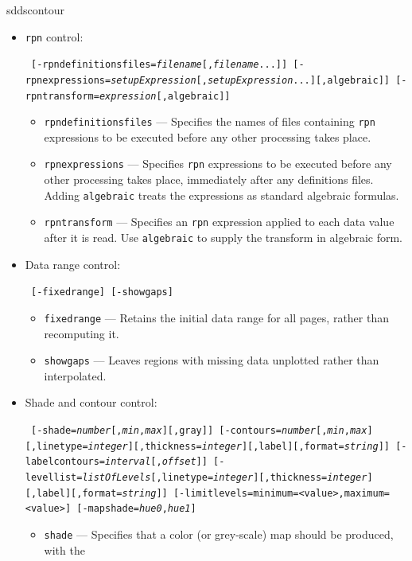 \begin{sddsprog}{sddscontour}
\begin{itemize}
    \item \verb|rpn| control:
\begin{flushleft}{\tt
[-rpndefinitionsfiles={\em filename}[,{\em filename}...]]
[-rpnexpressions={\em setupExpression}[,{\em setupExpression}...][,algebraic]]
[-rpntransform={\em expression}[,algebraic]]
}\end{flushleft}
        \begin{itemize}
        \item \verb|rpndefinitionsfiles| --- Specifies the names of files containing \verb|rpn| expressions
        to be executed before any other processing takes place.
        \item \verb|rpnexpressions| --- Specifies \verb|rpn| expressions to be executed before any other processing
         takes place, immediately after any definitions files.  Adding \verb|algebraic| treats the
         expressions as standard algebraic formulas.
        \item \verb|rpntransform| --- Specifies an \verb|rpn| expression applied to each data value after it is read.
         Use \verb|algebraic| to supply the transform in algebraic form.
        \end{itemize}
    \item Data range control:
\begin{flushleft}{\tt
[-fixedrange] [-showgaps]
}\end{flushleft}
        \begin{itemize}
        \item \verb|fixedrange| --- Retains the initial data range for all pages, rather than recomputing it.
        \item \verb|showgaps| --- Leaves regions with missing data unplotted rather than interpolated.
        \end{itemize}
    \item Shade and contour control:
\begin{flushleft}{\tt
[-shade={\em number}[,{\em min},{\em max}][,gray]]
[-contours={\em number}[,{\em min},{\em max}][,linetype={\em integer}][,thickness={\em integer}][,label][,format={\em string}]]
[-labelcontours={\em interval}[,{\em offset}]]
[-levellist={\em listOfLevels}[,linetype={\em integer}][,thickness={\em integer}][,label][,format={\em string}]]
[-limitlevels={minimum=<value>,}{maximum=<value>}]
[-mapshade={\em hue0},{\em hue1}]
}\end{flushleft}
        \begin{itemize}
        \item \verb|shade| --- Specifies that a color (or grey-scale) map should be produced, with the

\end{itemize}
\end{itemize}
\end{sddsprog}
